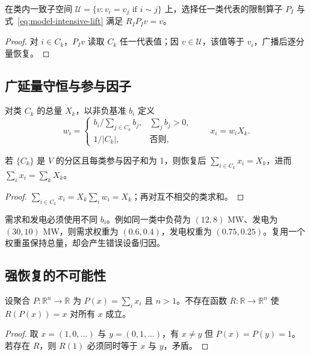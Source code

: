 \begin{proposition}[强度量往返]
在类内一致子空间 $\mathcal U=\{v:v_i=v_j\text{ if }i\sim j\}$ 上，选择任一类代表的限制算子 $P_I$
与式~\eqref{eq:model-intensive-lift} 满足 $R_IP_Iv=v$。
\end{proposition}
\begin{proof}
对 $i\in C_k$，$P_Iv$ 读取 $C_k$ 任一代表值；因 $v\in\mathcal U$，该值等于 $v_i$，广播后逐分量恢复。
\end{proof}

\subsection{广延量守恒与参与因子}

对类 $C_k$ 的总量 $X_k$，以非负基准 $b_i$ 定义
\begin{equation}
 w_i=\begin{cases}
 b_i/\sum_{j\in C_k}b_j,&\sum_jb_j>0,\\
 1/|C_k|,&\text{否则},
 \end{cases}
 \qquad x_i=w_iX_k.
 \label{eq:model-extensive-recovery}
\end{equation}

\begin{theorem}[分区广延量守恒]
若 $\{C_k\}$ 是 $V$ 的分区且每类参与因子和为 1，则恢复后
$\sum_{i\in C_k}x_i=X_k$，进而 $\sum_i x_i=\sum_kX_k$。
\end{theorem}
\begin{proof}
$\sum_{i\in C_k}x_i=X_k\sum_iw_i=X_k$；再对互不相交的类求和。
\end{proof}

需求和发电必须使用不同 $b_i$。例如同一类中负荷为 $(12,8)$ MW、发电为 $(30,10)$ MW，则需求权重为
$(0.6,0.4)$，发电权重为 $(0.75,0.25)$。复用一个权重虽保持总量，却会产生错误设备归因。

\subsection{强恢复的不可能性}

\begin{theorem}
设聚合 $P:\mathbb R^n\to\mathbb R$ 为 $P(x)=\sum_ix_i$ 且 $n>1$。不存在函数
$R:\mathbb R\to\mathbb R^n$ 使 $R(P(x))=x$ 对所有 $x$ 成立。
\end{theorem}
\begin{proof}
取 $x=(1,0,\ldots)$ 与 $y=(0,1,\ldots)$，有 $x\ne y$ 但 $P(x)=P(y)=1$。若存在 $R$，则
$R(1)$ 必须同时等于 $x$ 与 $y$，矛盾。
\end{proof}

